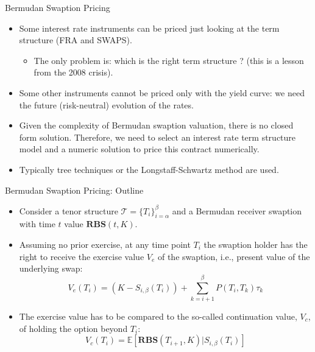 \documentclass{beamer}
\begin{document}
\begin{frame}{Bermudan Swaption Pricing}
\begin{itemize}
	\item Some interest rate instruments can be priced just looking at the term structure (FRA and SWAPS).
	\begin{itemize}
		\item The only problem is: which is the right term structure ? (this is a lesson from the 2008 crisis).
	\end{itemize}
	\item Some other instruments cannot be priced only with the yield curve: we need the future (risk-neutral) evolution of the rates.
	\item Given the complexity of Bermudan swaption valuation, there is no closed form solution. Therefore, we need to select an interest rate term structure model and a numeric solution to price this contract numerically.		
	\item Typically tree techniques or the Longstaff-Schwartz method are used.
\end{itemize}
\end{frame}

\begin{frame}{Bermudan Swaption Pricing: Outline}
	\begin{itemize}
	\item Consider a tenor structure $\mathcal{T}=\{T_i\}^\beta_{i=\alpha}$ and a Bermudan receiver swaption with time $t$ value $\textbf{RBS}(t,K)$.
	\item Assuming no prior exercise, at any time point $T_i$ the swaption holder has the right to receive the exercise value $V_e$ of the swaption, i.e., present value of the underlying swap:
	\begin{equation}
	V_e(T_i)=(K-S_{i,\beta}(T_i))+\sum^\beta_{k=i+1} P(T_i,T_k)\tau_k
	\label{eq:exercise_value}
	\end{equation}
	\item The exercise value has to be compared to the so-called continuation value, $V_c$, of holding the option beyond $T_i$:
	\begin{equation}
	V_c(T_i)=\mathbb{E}[\textbf{RBS}(T_{i+1},K)|S_{i,\beta}(T_i)]
	\label{eq:continuation_value}
	\end{equation}
\end{itemize}
\end{frame}
\end{document}
